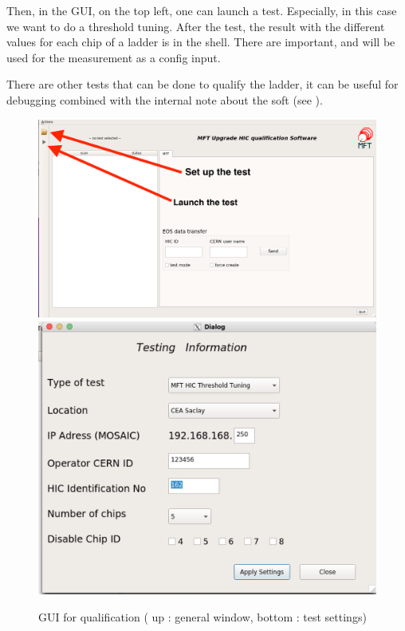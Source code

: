 \documentclass[12pt,oneside,a4]{article}
\begin{document}
Then, in the GUI, on the top left, one can launch a test. Especially, in this case we want to do a threshold tuning. After the test, the result with the different values for each chip of a ladder is in the shell. There are important, and will be used for the measurement as a config input.

There are other tests that can be done to qualify the ladder, it can be useful for debugging combined with the internal note about the soft (see \cite{Note}).

\begin{figure}[h]
        \centering
        \includegraphics[scale =0.3]{figures/Interface_example_1.png}
        \includegraphics[scale =0.3]{figures/Interface_example_2.png}
        \caption{GUI for qualification ( up : general window, bottom : test settings)}
        \label{fig:9}
\end{figure}
\end{document}
